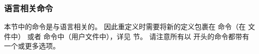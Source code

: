 \subsubsection{语言相关命令}%
\label{use:fmt:lng}


本节中的命令是与语言相关的。
因此重定义时需要将新的定义包裹在  命令（在  文件中）
或者  命令中（用户文件中），详见  节。
请注意所有以  开头的命令都带有一个或更多选项。

